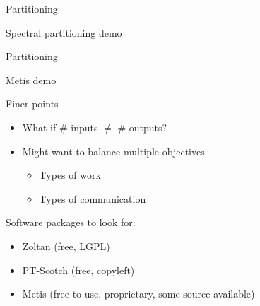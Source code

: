 \documentclass[english,compress]{beamer}
\begin{document}
\begin{frame}{Partitioning}
  \begin{center}
  \Huge Spectral partitioning demo
  \end{center}
\end{frame}
\begin{frame}{Partitioning}
  \begin{center}
  \Huge Metis demo
  \end{center}
\end{frame}
\begin{frame}{Finer points}
  \begin{itemize}
    \item What if \# inputs $\ne$ \# outputs? 
    \item Might want to balance multiple objectives
      \begin{itemize}
        \item Types of work
        \item Types of communication
      \end{itemize}
  \end{itemize}

  \bigskip
  Software packages to look for:
  \begin{itemize}
    \item Zoltan (free, LGPL)
    \item PT-Scotch (free, copyleft)
    \item Metis (free to use, proprietary, some source available)
  \end{itemize}
\end{frame}
\end{document}
